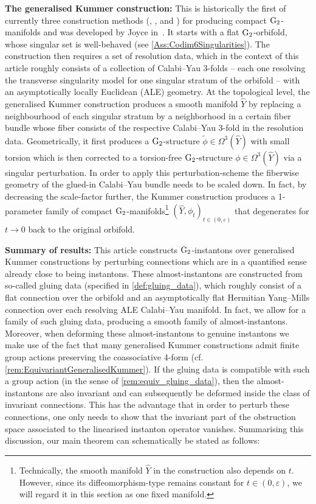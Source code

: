 \documentclass[11pt,a4paper]{scrartcl}
\newcommand{\G}{\textup{G}}
\numberwithin{equation}{section}
\theoremstyle{plain}
\theoremstyle{definition}
\theoremstyle{remark}
\begin{document}
\textbf{The generalised Kummer construction:} This is historically the first of currently three construction methods (\cite{Joyce-GeneralisedKummer2}, \cite{Kovalev-TCS}, and \cite{JoyceKarigiannis-Kummer}) for producing compact $\G_2$-manifolds and was developed by Joyce in~\cite{Joyce-GeneralisedKummer1, Joyce-GeneralisedKummer2}. It starts with a flat $\G_2$-orbifold, whose singular set is well-behaved (see \autoref{Ass:Codim6Singularities}). The construction then requires a set of resolution data, which in the context of this article roughly consists of a collection of Calabi--Yau 3-folds -- each one resolving the transverse singularity model for one singular stratum of the orbifold -- with an asymptotically locally Euclidean (ALE) geometry. At the topological level, the generalised Kummer construction produces a smooth manifold $\hat{Y}$ by replacing a neighbourhood of each singular stratum by a neighborhood in a certain fiber bundle whose fiber consists of the respective Calabi--Yau 3-fold in the resolution data. Geometrically, it first produces a $\G_2$-structure $\tilde{\phi} \in \Omega^3(\hat{Y})$ with small torsion which is then corrected to a torsion-free $\G_2$-structure $\phi \in \Omega^3(\hat{Y})$ via a singular perturbation. In order to apply this perturbation-scheme the fiberwise geometry of the glued-in Calabi--Yau bundle needs to be scaled down. In fact, by decreasing the scale-factor further, the Kummer construction produces a 1-parameter family of compact $\G_2$-manifolds\footnote{Technically, the smooth manifold $\hat{Y}$ in the construction also depends on $t$. However, since its diffeomorphism-type
remains constant for $t \in (0,\varepsilon)$, we will regard it in this section as one fixed manifold.} $(\hat{Y},\phi_t)_{t\in (0,\varepsilon)}$ that degenerates for $t\to 0$ back to the original orbifold. 

\textbf{Summary of results:} This article constructs $\G_2$-instantons over generalised Kummer constructions by perturbing connections which are in a quantified sense already close to being instantons. These almost-instantons are constructed from so-called gluing data (specified in \autoref{def:gluing_data}), which roughly consist of a flat connection over the orbifold and an asymptotically flat Hermitian Yang--Mills connection over each resolving ALE Calabi--Yau manifold. In fact, we allow for a family of such gluing data, producing a smooth family of almost-instantons. Moreover, when deforming these almost-instantons to genuine instantons we make use of the fact that many generalised Kummer constructions admit finite group actions preserving the coassociative 4-form (cf. \autoref{rem:EquivariantGeneralisedKummer}). If the gluing data is compatible with such a group action (in the sense of \autoref{rem:equiv_gluing_data}), then the almost-instantons are also invariant and can subsequently be deformed inside the class of invariant connections. This has the advantage that in order to perturb these connections, one only needs to show that the invariant part of the obstruction space associated to the linearised instanton operator vanishes. Summarising this discussion, our main theorem can schematically be stated as follows:
\end{document}
